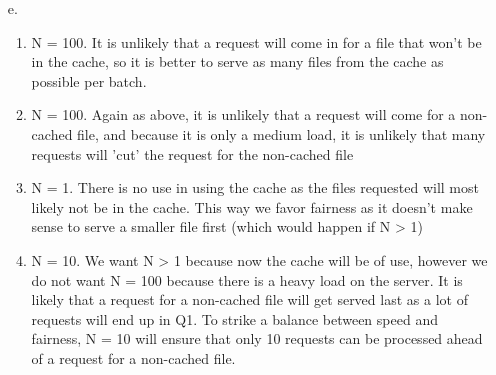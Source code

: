 \documentclass[11pt]{article}
\theoremstyle{definition}
\begin{document}
\begin{enumerate}
\begin{enumerate}
	\item[e.] 
		\begin{enumerate}
		\item N = 100.  It is unlikely that a request will come in for a file that won't be in the cache, so it is better to serve as many files from the cache as possible per batch.
		\item N = 100.  Again as above, it is unlikely that a request will come for a non-cached file, and because it is only a medium load, it is unlikely that many requests will 'cut' the request for the
		non-cached file
		\item N = 1. There is no use in using the cache as the files requested will most likely not be in the cache. This way we favor fairness as it doesn't make sense to serve a smaller file first (which would happen if N > 1)
		\item N = 10. We want N > 1 because now the cache will be of use, however we do not want N = 100 because there is a heavy load on the server.  It is likely that a request for a non-cached file will get served last as a lot
		of requests will end up in Q1.  To strike a balance between speed and fairness, N = 10 will ensure that only 10 requests can be processed ahead of a request for a non-cached file.
		\end{enumerate}
\end{enumerate}


\end{enumerate}
\end{document}
